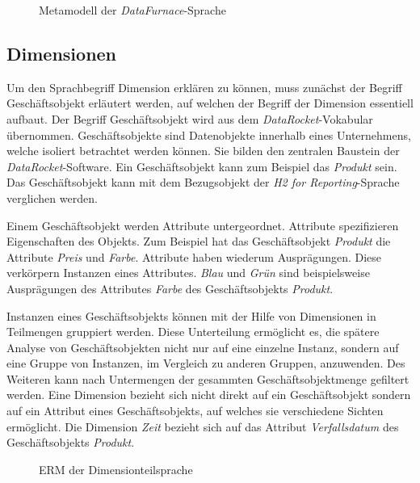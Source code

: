 \documentclass[
  language=german, %
  type=bachelor,%
  ngerman
]{isthesis}
\begin{document}
\begin{content}

  \begin{figure}
    \resizebox{\columnwidth}{!}{}
    \caption{Metamodell der \textit{DataFurnace}-Sprache}\label{fig:language_spec-erm}
  \end{figure}

  \subsection{Dimensionen}\label{subsec:dimension}

	Um den Sprachbegriff Dimension erklären zu können, muss zunächst der Begriff
  Geschäftsobjekt erläutert werden, auf welchen  der Begriff der Dimension
	essentiell aufbaut. Der Begriff Geschäftsobjekt wird aus dem
	\textit{DataRocket}-Vokabular übernommen. Geschäftsobjekte sind Datenobjekte
	innerhalb eines Unternehmens, welche isoliert betrachtet werden können. Sie
	bilden den zentralen Baustein der \textit{DataRocket}-Software. Ein
	Geschäftsobjekt kann zum Beispiel das \textit{Produkt} sein.  Das
	Geschäftsobjekt kann mit dem Bezugsobjekt der \textit{H2 for
	Reporting}-Sprache verglichen werden.

  Einem Geschäftsobjekt werden Attribute untergeordnet. Attribute spezifizieren
  Eigenschaften des Objekts. Zum Beispiel hat das Geschäftsobjekt
  \textit{Produkt} die Attribute \textit{Preis} und \textit{Farbe}. Attribute
  haben wiederum Ausprägungen.  Diese verkörpern Instanzen eines Attributes.
  \textit{Blau} und \textit{Grün} sind beispielsweise Ausprägungen des
  Attributes \textit{Farbe} des Geschäftsobjekts \textit{Produkt}.

	Instanzen eines Geschäftsobjekts können mit der Hilfe von Dimensionen in
	Teilmengen gruppiert werden. Diese Unterteilung ermöglicht es, die spätere
	Analyse von Geschäftsobjekten nicht nur auf eine einzelne Instanz, sondern
	auf eine Gruppe von Instanzen, \ggf{} im Vergleich zu anderen Gruppen,
	anzuwenden. Des Weiteren kann nach Untermengen der gesammten
	Geschäftsobjektmenge gefiltert werden.  Eine Dimension bezieht sich nicht
	direkt auf ein Geschäftsobjekt sondern auf ein Attribut eines
	Geschäftsobjekts, auf welches sie verschiedene Sichten ermöglicht. Die
	Dimension \textit{Zeit} bezieht sich \zB{} auf das Attribut
	\textit{Verfallsdatum} des Geschäftsobjekts \textit{Produkt}. 

  \begin{figure}
    \resizebox{200px}{!}{}
    \caption{\acrshort{ERM} der Dimensionteilsprache}\label{dimension-erm}
  \end{figure}


\end{content}
\end{document}
